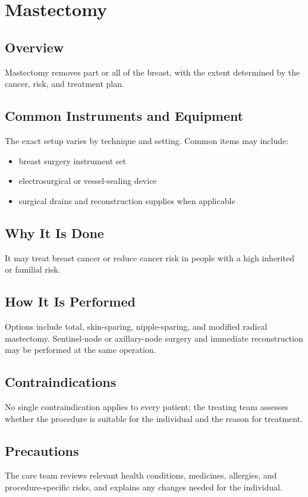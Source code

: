 \chapter{Mastectomy}
\section*{Overview}
Mastectomy removes part or all of the breast, with the extent determined by the cancer, risk, and treatment plan.
\section*{Common Instruments and Equipment}
The exact setup varies by technique and setting. Common items may include:
\begin{itemize}[nosep,leftmargin=*]
  \item breast surgery instrument set
  \item electrosurgical or vessel-sealing device
  \item surgical drains and reconstruction supplies when applicable
\end{itemize}

\section*{Why It Is Done}
It may treat breast cancer or reduce cancer risk in people with a high inherited or familial risk.
\section*{How It Is Performed}
Options include total, skin-sparing, nipple-sparing, and modified radical mastectomy. Sentinel-node or axillary-node surgery and immediate reconstruction may be performed at the same operation.
\section*{Contraindications}
No single contraindication applies to every patient; the treating team assesses whether the procedure is suitable for the individual and the reason for treatment.

\section*{Precautions}
The care team reviews relevant health conditions, medicines, allergies, and procedure-specific risks, and explains any changes needed for the individual.

